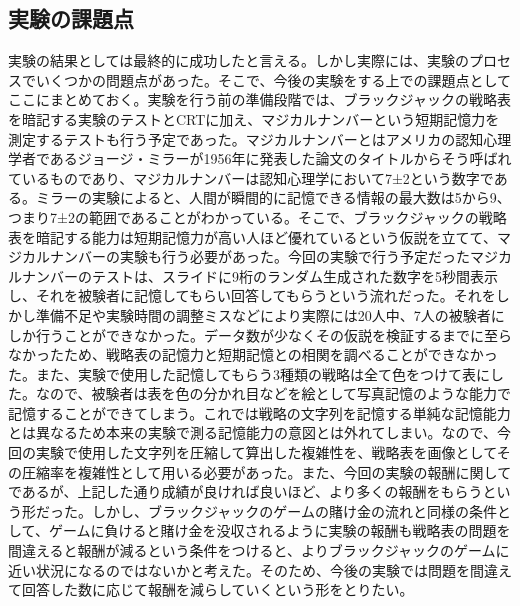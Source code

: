 \subsection{実験の課題点}
実験の結果としては最終的に成功したと言える。しかし実際には、実験のプロセスでいくつかの問題点があった。そこで、今後の実験をする上での課題点としてここにまとめておく。実験を行う前の準備段階では、ブラックジャックの戦略表を暗記する実験のテストとCRTに加え、マジカルナンバーという短期記憶力を測定するテストも行う予定であった。マジカルナンバーとはアメリカの認知心理学者であるジョージ・ミラーが1956年に発表した論文のタイトルからそう呼ばれているものであり、マジカルナンバーは認知心理学において7±2という数字である。ミラーの実験によると、人間が瞬間的に記憶できる情報の最大数は5から9、つまり7±2の範囲であることがわかっている。そこで、ブラックジャックの戦略表を暗記する能力は短期記憶力が高い人ほど優れているという仮説を立てて、マジカルナンバーの実験も行う必要があった。今回の実験で行う予定だったマジカルナンバーのテストは、スライドに9桁のランダム生成された数字を5秒間表示し、それを被験者に記憶してもらい回答してもらうという流れだった。それをしかし準備不足や実験時間の調整ミスなどにより実際には20人中、7人の被験者にしか行うことができなかった。データ数が少なくその仮説を検証するまでに至らなかったため、戦略表の記憶力と短期記憶との相関を調べることができなかった。また、実験で使用した記憶してもらう3種類の戦略は全て色をつけて表にした。なので、被験者は表を色の分かれ目などを絵として写真記憶のような能力で記憶することができてしまう。これでは戦略の文字列を記憶する単純な記憶能力とは異なるため本来の実験で測る記憶能力の意図とは外れてしまい。なので、今回の実験で使用した文字列を圧縮して算出した複雑性を、戦略表を画像としてその圧縮率を複雑性として用いる必要があった。また、今回の実験の報酬に関してであるが、上記した通り成績が良ければ良いほど、より多くの報酬をもらうという形だった。しかし、ブラックジャックのゲームの賭け金の流れと同様の条件として、ゲームに負けると賭け金を没収されるように実験の報酬も戦略表の問題を間違えると報酬が減るという条件をつけると、よりブラックジャックのゲームに近い状況になるのではないかと考えた。そのため、今後の実験では問題を間違えて回答した数に応じて報酬を減らしていくという形をとりたい。
